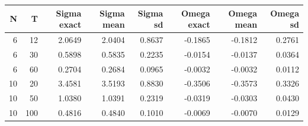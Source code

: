 \begin{tabular}{rrrrrrrr}
\toprule
N & T & Sigma exact & Sigma mean & Sigma sd & Omega exact & Omega mean & Omega sd \\
\midrule
6 & 12 & 2.0649 & 2.0404 & 0.8637 & -0.1865 & -0.1812 & 0.2761 \\
6 & 30 & 0.5898 & 0.5835 & 0.2235 & -0.0154 & -0.0137 & 0.0364 \\
6 & 60 & 0.2704 & 0.2684 & 0.0965 & -0.0032 & -0.0032 & 0.0112 \\
10 & 20 & 3.4581 & 3.5193 & 0.8830 & -0.3506 & -0.3573 & 0.3326 \\
10 & 50 & 1.0380 & 1.0391 & 0.2319 & -0.0319 & -0.0303 & 0.0430 \\
10 & 100 & 0.4816 & 0.4840 & 0.1010 & -0.0069 & -0.0070 & 0.0129 \\
\bottomrule
\end{tabular}
